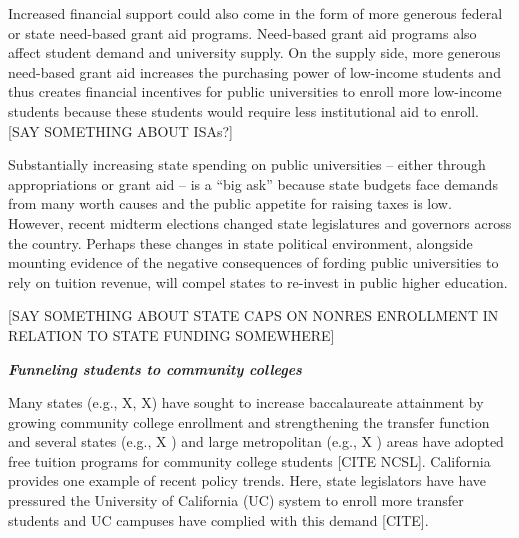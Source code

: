 \documentclass[twoside]{article}
\begin{document}
Increased financial support could also come in the form of more generous federal or state need-based grant aid programs.  Need-based grant aid programs also affect student demand and university supply.  On the supply side, more generous need-based grant aid increases the purchasing power of low-income students and thus creates financial incentives for public universities to enroll more low-income students because these students would require less institutional aid to enroll. [SAY SOMETHING ABOUT ISAs?]

Substantially increasing state spending on public universities -- either through appropriations or grant aid -- is a ``big ask'' because state budgets face demands from many worth causes and the public appetite for raising taxes is low.  However, recent midterm elections changed state legislatures and governors across the country.  Perhaps these changes in state political environment, alongside mounting evidence of the negative consequences of fording public universities to rely on tuition revenue, will compel states to re-invest in public higher education.


[SAY SOMETHING ABOUT STATE CAPS ON NONRES ENROLLMENT IN RELATION TO STATE FUNDING SOMEWHERE]

\textbf{\textit{Funneling students to community colleges}}

Many states (e.g., X, X) have sought to increase baccalaureate attainment by growing community college enrollment and strengthening the transfer function and several states (e.g., X ) and large metropolitan (e.g., X ) areas have adopted free tuition programs for community college students [CITE NCSL].  California provides one example of recent policy trends. Here, state legislators have have pressured the University of California (UC) system to enroll more transfer students and UC campuses have complied with this demand [CITE].  
\end{document}
